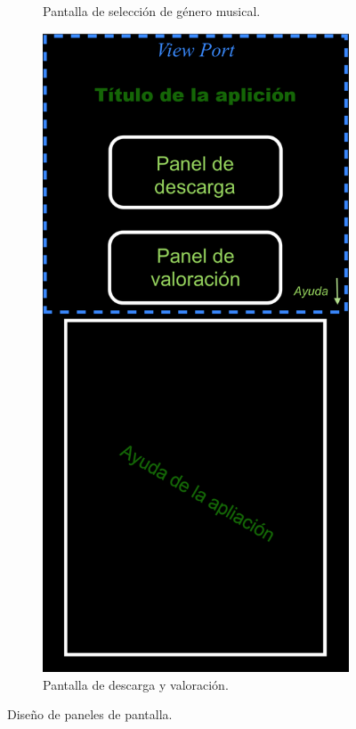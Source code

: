 \begin{figure}[H]
{\begin{minipage}{\textwidth}
\begin{subfigure}[t]{0.4\textwidth}
          \caption{Pantalla de selección de género musical.}
          \label{fig:pantalla-seleccion}
      \end{subfigure}
      \hfill
      \begin{subfigure}[t]{0.4\textwidth}
          \centering
          \includegraphics[width=\textwidth]{images/panel-descarga-valoracion.png}
          \caption{Pantalla de descarga y valoración.}
          \label{fig:pantalla-descarga}
      \end{subfigure}
    \end{minipage}
  }
  \caption{Diseño de paneles de pantalla.}
  \label{fig:diseno-paneles}
\end{figure}


